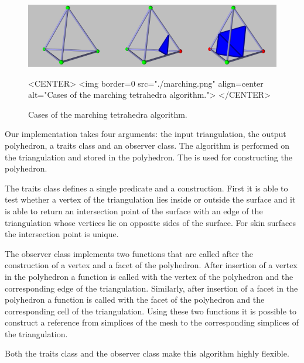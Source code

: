 \begin{figure}
\begin{ccTexOnly}
\begin{center}
\includegraphics[width=\textwidth]{Skin_surface_3/marching}
\end{center}
\end{ccTexOnly}
\begin{ccHtmlOnly}
<CENTER>
<img border=0 src="./marching.png" align=center
alt="Cases of the marching tetrahedra algorithm.">
</CENTER>
\end{ccHtmlOnly}

\caption{\label{SkinSurface3-fig-marching} Cases of the marching
  tetrahedra algorithm.}
\end{figure}

Our implementation takes four arguments: the input triangulation, the
output polyhedron, a traits class and an observer class.  The
algorithm is performed on the triangulation and stored in the
polyhedron. The  is used for
constructing the polyhedron.

The traits class defines a single predicate and a construction. First
it is able to test whether a vertex of the triangulation lies inside
or outside the surface and it is able to return an intersection point
of the surface with an edge of the triangulation whose vertices lie on
opposite sides of the surface. For skin surfaces the intersection
point is unique.

The observer class implements two functions that are called after the
construction of a vertex and a facet of the polyhedron. After
insertion of a vertex in the polyhedron a function is called with the
vertex of the polyhedron and the corresponding edge of the
triangulation. Similarly, after insertion of a facet in the polyhedron
a function is called with the facet of the polyhedron and the
corresponding cell of the triangulation. Using these two functions it
is possible to construct a reference from simplices of the mesh to the
corresponding simplices of the triangulation.

Both the traits class and the observer class make this algorithm highly
flexible.
